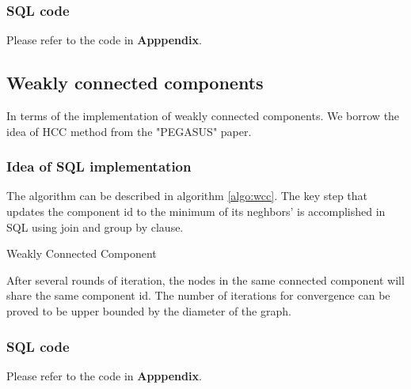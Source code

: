 \subsubsection{SQL code}
Please refer to the code in {\bf Apppendix}.

\subsection{Weakly connected components}
In terms of the implementation of weakly connected components. We borrow the idea of HCC method from the "PEGASUS" paper.\cite{Kang09}

\subsubsection{Idea of SQL implementation}
The algorithm can be described in algorithm \ref{algo:wcc}. The key step that updates the 
component id to the minimum of its neghbors' is accomplished in SQL using join and group by
clause.
\begin{algorithm}
\caption{Weakly Connected Component}
\begin{algorithmic}
\REPEAT
{}
\end{algorithmic}
\label{algo:wcc}
\end{algorithm}
After several rounds of iteration, the nodes in the same connected component will share the same component id.
The number of iterations for convergence can be proved to be upper bounded by the diameter of the graph.

\subsubsection{SQL code}
Please refer to the code in {\bf Apppendix}.

